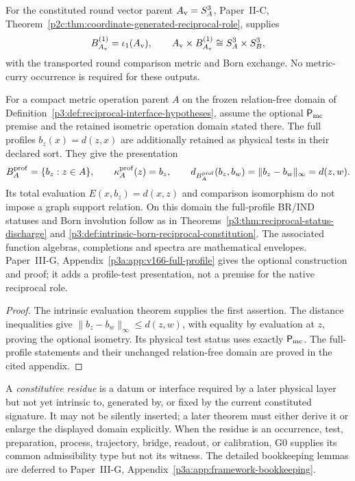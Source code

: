 \documentclass[12pt,a4paper]{article}
\begin{document}
\begin{theorem}
\label{p3a:thm:v166-reciprocal-interface-summary}
For the constituted round vector parent \(A_{\rm v}=S_A^3\), Paper~II-C,
Theorem~\ref{p2c:thm:coordinate-generated-reciprocal-role}, supplies
\[
 B_{A_{\rm v}}^{(1)}=\iota_1(A_{\rm v}),\qquad
 A_{\rm v}\times B_{A_{\rm v}}^{(1)}\cong S_A^3\times S_B^3,
\]
with the transported round comparison metric and Born exchange. No
metric-curry occurrence is required for these outputs.

For a compact metric operation parent \(A\) on the frozen relation-free
domain of Definition~\ref{p3:def:reciprocal-interface-hypotheses}, assume
the optional \(\mathsf P_{\rm mc}\) premise and the retained isometric
operation domain stated there. The full profiles
\(b_z(x)=d(z,x)\) are additionally retained as physical tests in their
declared sort. They give the presentation
\[
 B_A^{\rm prof}=\{b_z:z\in A\},\qquad
 \kappa_A^{\rm prof}(z)=b_z,\qquad
 d_{B_A^{\rm prof}}(b_z,b_w)=\|b_z-b_w\|_\infty=d(z,w).
\]
Its total evaluation \(E(x,b_z)=d(x,z)\) and comparison isomorphism do
not impose a graph support relation. On this domain the full-profile
BR/IND statuses and Born involution follow as in
Theorems~\ref{p3:thm:reciprocal-status-discharge} and
\ref{p3:def:intrinsic-born-reciprocal-constitution}.
The associated function algebras, completions and spectra are mathematical
envelopes. Paper~III-G, Appendix~\ref{p3a:app:v166-full-profile} gives the optional
construction and proof; it adds a profile-test presentation, not a premise
for the native reciprocal role.
\end{theorem}
\begin{proof}
The intrinsic evaluation theorem supplies the first assertion. The distance
inequalities give \(\|b_z-b_w\|_\infty\le d(z,w)\), with equality by
evaluation at \(z\), proving the optional isometry. Its physical test
status uses exactly \(\mathsf P_{\rm mc}\). The full-profile statements
and their unchanged relation-free domain are proved in the cited appendix.
\end{proof}



\begin{definition}
\label{p3:def:constitutive-residue-main}
A \emph{constitutive residue} is a datum or interface required by a later
physical layer but not yet intrinsic to, generated by, or fixed by the current
constituted signature.  It may not be silently inserted; a later theorem must
either derive it or enlarge the displayed domain explicitly.  When the residue
is an occurrence, test, preparation, process, trajectory, bridge, readout, or
calibration, G0 supplies its common admissibility type but not its witness.
The detailed
bookkeeping lemmas are deferred to Paper~III-G, Appendix~\ref{p3a:app:framework-bookkeeping}.
\end{definition}
\end{document}
